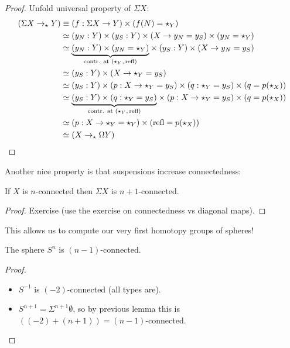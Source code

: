 \documentclass[10pt,oneside,leqno,openright]{memoir}
\begin{document}
\begin{proof}
    Unfold universal property of $\Sigma X$:
    \begin{align*}
        (\Sigma X \to_\star Y)
        &\equiv (f : \Sigma X \to Y) \times (f(N) = \star_Y) \\
      &\simeq (y_N : Y) \times (y_S : Y) \times (X \to y_N = y_S) \times (y_N = \star_Y)\\
      &\simeq \underset{\text{contr. at $(\star_Y,\mathrm{refl})$}}{\underbrace{(y_N : Y) \times (y_N = \star_Y)}} \times (y_S : Y) \times (X \to y_N = y_S)\\
      &\simeq (y_S : Y) \times (X \to \star_Y = y_S)\\
      &\simeq (y_S : Y) \times (p : X \to \star_Y = y_S) \times (q : \star_Y = y_S) \times (q = p(\star_X))\\
      &\simeq \underset{\text{contr. at $(\star_Y,\mathrm{refl})$}}{\underbrace{(y_S : Y)  \times (q : \star_Y = y_S)}}  \times (p : X \to \star_Y = y_S) \times (q = p(\star_X)) \\
      &\simeq (p : X \to \star_Y = \star_Y) \times (\mathrm{refl} = p(\star_X))\\
      &\simeq (X \to_\star \Omega Y)
    \end{align*}
\end{proof}


Another nice property is that suspensions increase connectedness:
\begin{theorem}
    If $X$ is $n$-connected then $\Sigma X$ is $n+1$-connected.
\end{theorem}
\begin{proof}
  Exercise (use the exercise on connectedness vs diagonal maps).
\end{proof}
This allows us to compute our very first homotopy groups of spheres!
\begin{corollary}
    The sphere $S^n$ is $(n-1)$-connected.
\end{corollary}
\begin{proof}
\begin{itemize}
\item $S^{-1}$ is $(-2)$-connected (all types are).
\item $S^{n+1} = \Sigma^{n+1}\emptyset$, so by previous lemma this is $((-2) + (n+1)) = (n-1)$-connected. \qedhere
\end{itemize}
\end{proof}
\end{document}
